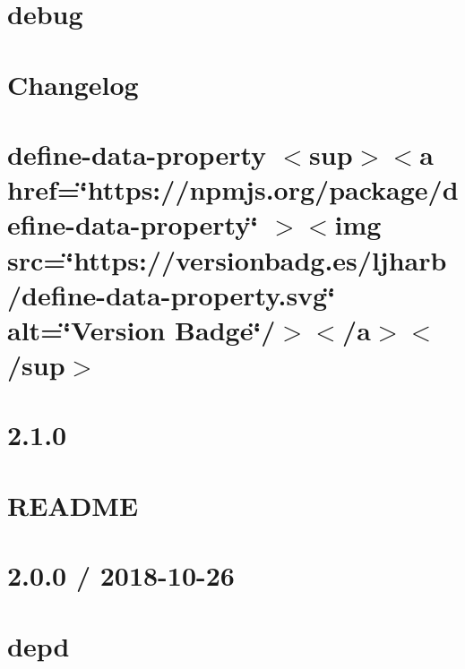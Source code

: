 \documentclass[twoside]{book}
\newcommand{\+}{\discretionary{\mbox{\scriptsize$\hookleftarrow$}}{}{}}
\begin{document}
\chapter{debug}
\label{md_src_nodejs_node_modules_debug_README}

\chapter{Changelog}
\label{md_src_nodejs_node_modules_define_data_property_CHANGELOG}

\chapter{define-\/data-\/property \texorpdfstring{$<$}{<}sup\texorpdfstring{$>$}{>}\texorpdfstring{$<$}{<}a href=\char`\"{}https\+://npmjs.\+org/package/define-\/data-\/property\char`\"{} \texorpdfstring{$>$}{>}\texorpdfstring{$<$}{<}img src=\char`\"{}https\+://versionbadg.\+es/ljharb/define-\/data-\/property.\+svg\char`\"{} alt=\char`\"{}\+Version Badge\char`\"{}/\texorpdfstring{$>$}{>}\texorpdfstring{$<$}{<}/a\texorpdfstring{$>$}{>}\texorpdfstring{$<$}{<}/sup\texorpdfstring{$>$}{>}}
\label{md_src_nodejs_node_modules_define_data_property_README}

\chapter{2.1.0}
\label{md_src_nodejs_node_modules_denque_CHANGELOG}

\chapter{README}
\label{md_src_nodejs_node_modules_denque_README}

\chapter{2.0.0 / 2018-\/10-\/26}
\label{md_src_nodejs_node_modules_depd_History}

\chapter{depd}
\label{md_src_nodejs_node_modules_depd_Readme}

\end{document}

